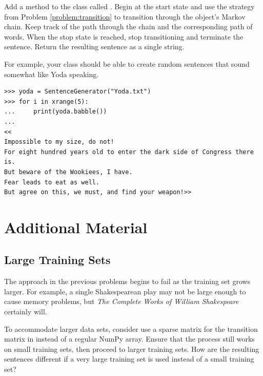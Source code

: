 \begin{problem} %
Add a method to the  class called .
Begin at the start state and use the strategy from Problem \ref{problem:transition} to transition through the object's Markov chain.
Keep track of the path through the chain and the corresponding path of words.
When the stop state is reached, stop transitioning and terminate the sentence.
Return the resulting sentence as a single string.

For example, your  class should be able to create random sentences that sound somewhat like Yoda speaking.
\begin{lstlisting}
>>> yoda = SentenceGenerator("Yoda.txt")
>>> for i in xrange(5):
... 	print(yoda.babble())
...
<<
Impossible to my size, do not!
For eight hundred years old to enter the dark side of Congress there is.
But beware of the Wookiees, I have.
Fear leads to eat as well.
But agree on this, we must, and find your weapon!>>
\end{lstlisting}
\end{problem}

\section*{Additional Material} %

\subsection*{Large Training Sets} %

The approach in the previous problems begins to fail as the training set grows larger.
For example, a single Shakespearean play may not be large enough to cause memory problems, but \emph{The Complete Works of William Shakespeare} certainly will.

To accommodate larger data sets, consider use a sparse matrix for the transition matrix in instead of a regular NumPy array. %
Ensure that the process still works on small training sets, then proceed to larger training sets.
How are the resulting sentences different if a very large training set is used instead of a small training set?


